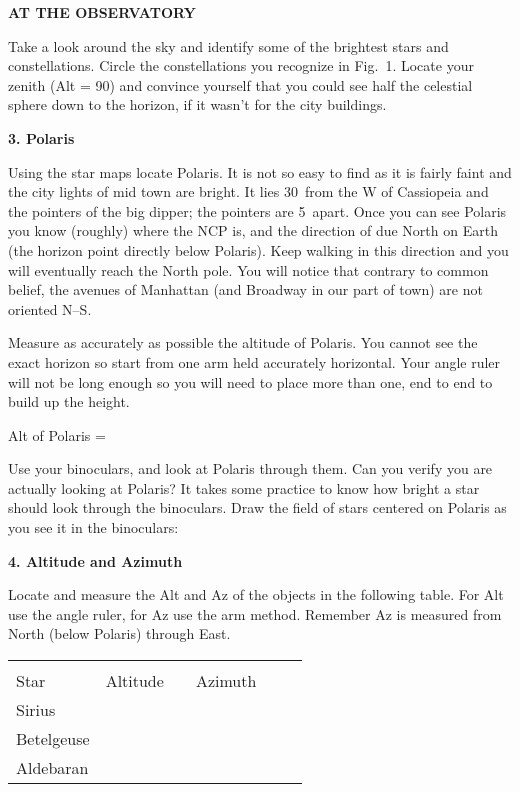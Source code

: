 \medskip
\bigskip\noindent
{\bf AT THE OBSERVATORY}
\bigskip


\noindent 
Take a look around the sky and identify some of the brightest stars
and constellations. Circle the constellations you recognize in
Fig.~1. 
Locate your zenith (Alt = 90\deg) and convince yourself that you
could see half the celestial sphere down to the horizon, if it wasn't
for the city buildings.

\bigskip\noindent
{\bf 3. Polaris}

\bigskip\noindent
Using the star maps locate Polaris. It is not so easy to find as it is
fairly faint and the city lights of mid town are bright. It lies
30\deg\ from the W of Cassiopeia and the pointers of the big dipper;
the pointers are 5\deg\ apart.  Once you can see Polaris you know
(roughly) where the NCP is, and the direction of due North on Earth
(the horizon point directly below Polaris). Keep walking in this
direction and you will eventually reach the North pole. You will
notice that contrary to common belief, the avenues of Manhattan (and
Broadway in our part of town) are not oriented N--S.
 
\noindent Measure as accurately as possible the altitude of Polaris. You cannot
see the exact horizon so start from one arm held accurately
horizontal. Your angle ruler will not be long enough so you will need to
place more than one, end to end to build up the height.

\bigskip
{\hfill Alt of Polaris = \makebox[4cm]{\hrulefill} \hfill}

\clearpage

\noindent Use your binoculars, and look at Polaris through them. Can you verify
you are actually looking at Polaris?  It takes some practice to know
how bright a star should look through the binoculars. Draw the field
of stars centered on Polaris as you see it in the binoculars:

\centerline{}


\bigskip\noindent
{\bf 4. Altitude and Azimuth}

\bigskip\noindent
Locate and measure the Alt and Az of the objects in the following
table. For Alt use the angle ruler, for Az use the arm
method. Remember Az is measured from North (below Polaris) through East.

\begin{center}
\begin{tabular}{lcc} \hline \\ [-6pt]
Star   &\hspace{1.5cm} Altitude \hspace{1.5cm} & \ \ Azimuth \ \ \ \
 \\ [6pt]  \hline
Sirius    &   &        \\ \hline
Betelgeuse    &   &       \\ \hline
Aldebaran    &   &       \\  \hline
\end{tabular}
\end{center}

